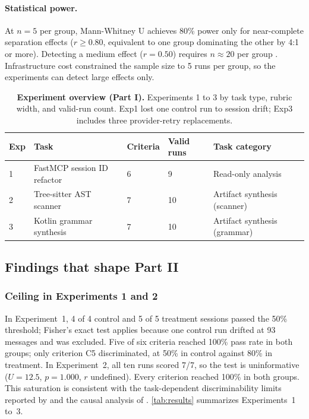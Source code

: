\documentclass[11pt,a4paper]{article}
\begin{document}
\paragraph{Statistical power.}
\label{par:power}
At $n{=}5$ per group, Mann-Whitney U achieves 80\% power only for near-complete separation effects ($r \geq 0.80$, equivalent to one group dominating the other by 4:1 or more).
Detecting a medium effect ($r{=}0.50$) requires $n \approx 20$ per group \citep{faul2007}.
Infrastructure cost constrained the sample size to 5 runs per group, so the experiments can detect large effects only.

\begin{table}[h]
\centering
\caption{\small \textbf{Experiment overview (Part I).} Experiments 1 to 3 by task type, rubric width, and valid-run count. Exp1 lost one
control run to session drift; Exp3 includes three provider-retry replacements.}
\label{tab:experiments}
\begin{tabular}{lllll}
\toprule
Exp & Task & Criteria & Valid runs & Task category \\
\midrule
1 & FastMCP session ID refactor & 6 & 9 & Read-only analysis \\
2 & Tree-sitter AST scanner & 7 & 10 & Artifact synthesis (scanner) \\
3 & Kotlin grammar synthesis & 7 & 10 & Artifact synthesis (grammar) \\
\bottomrule
\end{tabular}
\end{table}

\subsection{Findings that shape Part II}
\label{sec:results}

\subsubsection{Ceiling in Experiments 1 and 2}

In Experiment~1, 4 of 4 control and 5 of 5 treatment sessions passed the 50\% threshold; Fisher's exact test applies because one control run drifted at 93 messages and was excluded.
Five of six criteria reached 100\% pass rate in both groups; only criterion C5 discriminated, at 50\% in control against 80\% in treatment.
In Experiment~2, all ten runs scored 7/7, so the test is uninformative ($U{=}12.5$, $p{=}1.000$, $r$ undefined).
Every criterion reached 100\% in both groups.
This saturation is consistent with the task-dependent discriminability limits reported by \citet{qian2026} and the causal analysis of \citet{chen2026causal}.
\autoref{tab:results} summarizes Experiments~1 to~3.
\end{document}
